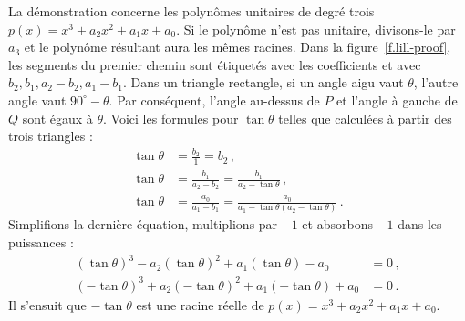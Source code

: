 La démonstration concerne les polynômes unitaires de degré trois $p(x)=x^3+a_2x^2+a_1x+a_0$. Si le polynôme n'est pas unitaire, divisons-le par $a_3$ et le polynôme résultant aura les mêmes racines. Dans la figure~\ref{f.lill-proof}, les segments  du premier chemin sont étiquetés avec les coefficients et avec $b_2,b_1,a_2-b_2,a_1-b_1$. Dans un triangle rectangle, si un angle aigu vaut $\theta$, l'autre angle vaut $90^\circ-\theta$. Par conséquent, l'angle au-dessus de $P$ et l'angle à gauche de $Q$ sont égaux à $\theta$. Voici les formules pour $\tan \theta$ telles que calculées à partir des trois triangles :
\begin{align*}
\tan \theta &= \frac{b_2}{1}=b_2\,,\\
\tan \theta &= \frac{b_1}{a_2-b_2}=\frac{b_1}{a_2-\tan\theta}\,,\\
\tan \theta &= \frac{a_0}{a_1-b_1}=\frac{a_0}{a_1-\tan\theta(a_2-\tan\theta)}\,.
\end{align*}
Simplifions la dernière équation, multiplions par $-1$ et absorbons $-1$ dans les puissances :
\begin{align*}
(\tan\theta)^3-a_2(\tan\theta)^2+a_1(\tan\theta)-a_0&=0\,,\\
(-\tan\theta)^3+a_2(-\tan\theta)^2+a_1(-\tan\theta)+a_0&=0\,.
\end{align*}
Il s'ensuit que $-\tan\theta$ est une racine réelle de  $p(x)=x^3+a_2x^2+a_1x+a_0$.

